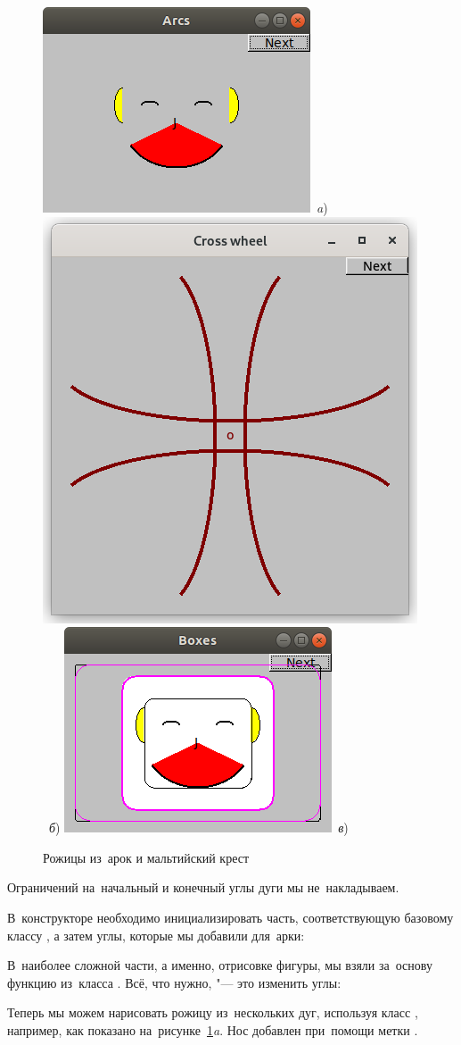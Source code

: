 \begin{figure}[ht]
    {\centering
        \includegraphics[height=0.25\textwidth]{images/arc.png}~\textit{a})
        \hfil
        \includegraphics[height=0.25\textwidth]{images/cross_wheel.png}~\textit{б})
        \hfil
        \includegraphics[height=0.25\textwidth]{images/box.png}~\textit{в})

    }
    \caption{Рожицы из~арок и мальтийский крест}
    \label{fig:arc}
\end{figure}


\noindent
Ограничений на~начальный и конечный углы дуги мы не~накладываем.

В~конструкторе необходимо инициализировать часть, соответствующую базовому классу , а затем углы, которые мы добавили для~арки:


В~наиболее сложной части, а именно, отрисовке фигуры, мы взяли за~основу функцию из~класса . Всё, что нужно, "--- это изменить углы:


Теперь мы можем нарисовать рожицу из~нескольких дуг, используя класс , например, как показано на~рисунке~\ref{fig:arc}\textit{a}. Нос добавлен при~помощи метки .




